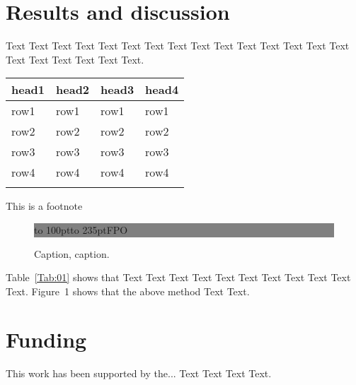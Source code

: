 \documentclass{bioinfo}
\begin{document}
\section{Results and discussion}

Text Text Text Text Text Text  Text Text Text Text Text Text Text
Text Text  Text Text Text Text Text Text.

\begin{table}[!t]
 {\begin{tabular}{@{}llll@{}}\toprule head1 &
head2 & head3 & head4\\\midrule
row1 & row1 & row1 & row1\\
row2 & row2 & row2 & row2\\
row3 & row3 & row3 & row3\\
row4 & row4 & row4 & row4\\\botrule
\end{tabular}}{This is a footnote}
\end{table}

\begin{figure}[!tpb]%
\fboxsep=0pt\colorbox{gray}{\begin{minipage}[t]{235pt} \vbox to 100pt{\vfill\hbox to
235pt{\hfill\fontsize{24pt}{24pt}\selectfont FPO\hfill}\vfill}
\end{minipage}}
\caption{Caption, caption.}\label{fig:01}
\end{figure}


Table~\ref{Tab:01} shows that Text Text Text Text Text  Text Text
Text Text Text Text. Figure~1\vphantom{\ref{fig:01}} shows that
the above method Text Text. 


%
%


\section*{Funding}

This work has been supported by the... Text Text  Text Text.\vspace*{-12pt}
\end{document}
